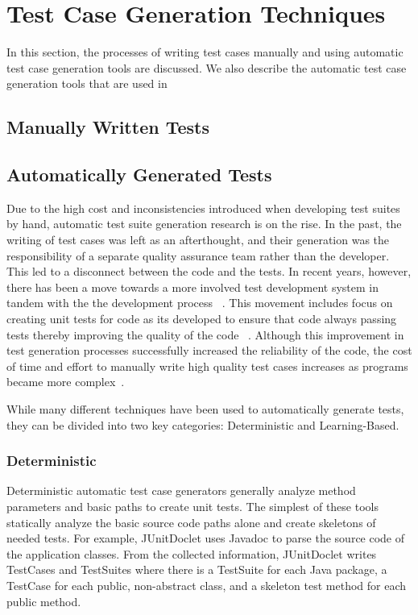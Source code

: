 
\section{Test Case Generation Techniques}
\label{sec:background}
In this section, the processes of writing test cases manually and using automatic test case generation tools are discussed.  We also describe the automatic test case generation tools that are used in 

\subsection{Manually Written Tests}


\subsection{Automatically Generated Tests}
Due to the high cost and inconsistencies introduced when developing test suites by hand, automatic test suite generation research is on the rise.  In the past, the writing of test cases was left as an afterthought, and their generation was the responsibility of a separate quality assurance team rather than the developer.  This led to a disconnect between the code and the tests.  In recent years, however, there has been a move towards a more involved test development system in tandem with the the development process ~\cite{Gelperin:1988:GST:62959.62965}.  This movement includes focus on creating unit tests for code as its developed to ensure that code always passing tests thereby improving the quality of the code ~\cite{Canfora:2006:EAT:1159733.1159788}.  Although this improvement in test generation processes successfully increased the reliability of the code, the cost of time and effort to manually write high quality test cases increases as programs became more complex~\cite{clarke1998automated}. 

While many different techniques have been used to automatically generate tests, they can be divided into two key categories: Deterministic and Learning-Based.

\subsubsection{Deterministic}
Deterministic automatic test case generators generally analyze method parameters and basic paths to create unit tests.  The simplest of these tools statically analyze the basic source code paths alone and create skeletons of  needed tests.  For example, JUnitDoclet \cite{JUnitDoclet} uses Javadoc to parse the source code of the application classes. From the collected information, JUnitDoclet writes TestCases and TestSuites where there is a TestSuite for each Java package, a TestCase for each public, non-abstract class, and a skeleton test method for each public method. %

